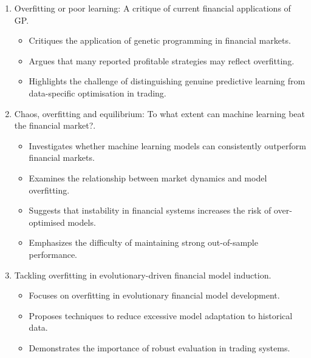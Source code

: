 \begin{enumerate}
        \begin{itemize}
        \item Reviews common causes of overfitting in predictive modelling.
        \item Proposes correction strategies to improve model stability and generalization.
        \item Stresses the importance of separating training and testing data properly.
        \end{itemize}
        
        \item Overfitting or poor learning: A critique of current financial applications of GP.
        \cite {shu2003overfitting}

        \begin{itemize}
        \item Critiques the application of genetic programming in financial markets.
        \item Argues that many reported profitable strategies may reflect overfitting.
        \item Highlights the challenge of distinguishing genuine predictive learning from data-specific optimisation in trading.
        \end{itemize}
        
        \item Chaos, overfitting and equilibrium: To what extent can machine learning beat the financial market?.
        \cite {peng2024chaos}

        \begin{itemize}
        \item Investigates whether machine learning models can consistently outperform financial markets.
        \item Examines the relationship between market dynamics and model overfitting.
        \item Suggests that instability in financial systems increases the risk of over-optimised models.
        \item Emphasizes the difficulty of maintaining strong out-of-sample performance.
        \end{itemize}
        
        \item Tackling overfitting in evolutionary-driven financial model induction.
        \cite {tuite2011tackling}

        \begin{itemize}
        \item Focuses on overfitting in evolutionary financial model development.
        \item Proposes techniques to reduce excessive model adaptation to historical data.
        \item Demonstrates the importance of robust evaluation in trading systems.
        \end{itemize}
        
    \end{enumerate}

